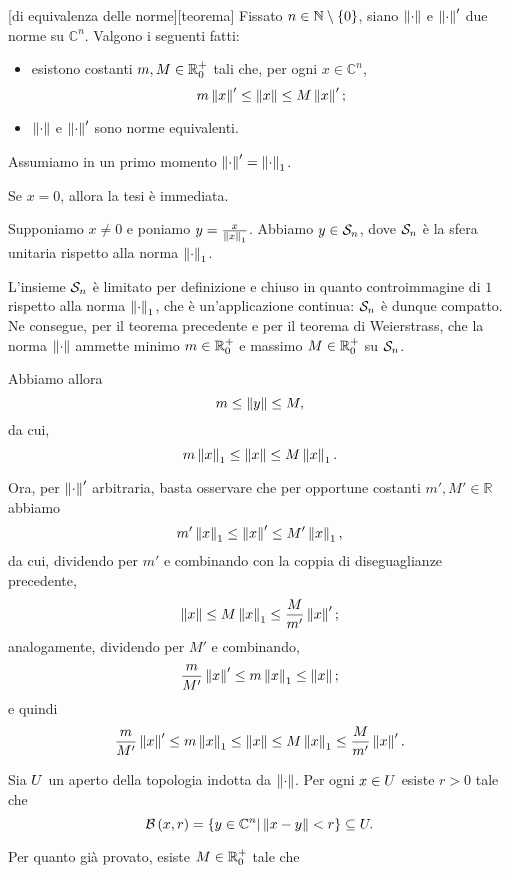 \begin{Theorem}
  [di equivalenza delle norme][teorema]
  Fissato $n \in \mathbb{N} \setminus \lbrace 0 \rbrace$, siano $\Norm{\cdot}$ e $\Norm{\cdot}'$ due norme
  su $\mathbb{C}^n$. Valgono i seguenti fatti:
  \begin{itemize}
    \item esistono costanti $m, M \in \mathbb{R}^+_0$ tali che, per ogni
      $x \in \mathbb{C}^n$,
      \[
        m\Norm{x}' \leq \Norm{x} \leq M\Norm{x}';
      \]
    \item $\Norm{\cdot}$ e $\Norm{\cdot}'$ sono norme equivalenti.
  \end{itemize}
\end{Theorem}
\Proof Assumiamo in un primo momento $\Norm{\cdot}' = \Norm{\cdot}[1]$.
\par Se $x = 0$, allora la tesi \`e immediata.
\par Supponiamo $x \neq 0$ e poniamo
$y = \frac{x}{\Norm{x}[1]}$. Abbiamo $y \in \mathcal{S}_{n}$, dove $\mathcal{S}_{n}$ \`e
la sfera unitaria rispetto alla norma $\Norm{\cdot}[1]$.
\par L'insieme $\mathcal{S}_{n}$ \`e limitato per definizione e chiuso in quanto
controimmagine di $1$ rispetto alla norma $\Norm{\cdot}[1]$, che \`e
un'applicazione continua: $\mathcal{S}_{n}$ \`e dunque compatto.
Ne consegue, per il teorema precedente e per il teorema di Weierstrass,
 che la norma $\Norm{\cdot}$ ammette minimo $m \in \mathbb{R}^+_0$ e massimo
$M \in \mathbb{R}^+_0$ su $\mathcal{S}_{n}$.
\par Abbiamo allora
\[
  m \leq \Norm{y} \leq M,
\]
da cui,
\[
  m\Norm{x}[1] \leq \Norm{x} \leq M\Norm{x}[1].
\]
\par Ora, per $\Norm{\cdot}'$ arbitraria, basta osservare che per opportune
costanti $m', M' \in \mathbb{R}$ abbiamo 
\[
  m'\Norm{x}[1] \leq \Norm{x}' \leq M'\Norm{x}[1],
\]
da cui, dividendo per $m'$ e combinando con la coppia di diseguaglianze
precedente,
\[
  \Norm{x} \leq M\Norm{x}[1] \leq \frac{M}{m'}\Norm{x}';
\]
analogamente, dividendo per $M'$ e combinando,
\[
  \frac{m}{M'} \Norm{x}' \leq m\Norm{x}[1] \leq \Norm{x};
\]
e quindi
\[
  \frac{m}{M'} \Norm{x}' \leq m\Norm{x}[1] \leq \Norm{x}
  \leq M\Norm{x}[1] \leq \frac{M}{m'}\Norm{x}'.
\]
\par Sia $U$ un aperto della topologia indotta da $\Norm{\cdot}$.
Per ogni $x \in U$ esiste $r > 0$ tale che
\[
  \OpenBall{x}{r} = \lbrace y \in \mathbb{C}^n | \Norm{x - y} < r \rbrace
    \subseteq \Open.
\]
\par Per quanto gi\`a provato, esiste $M \in \mathbb{R}^+_0$ tale che
